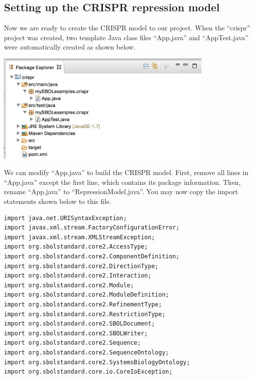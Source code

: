\subsection*{Setting up the CRISPR repression model}
Now we are ready to create the CRISPR model to our project. When the ``crispr'' project was created, two template Java class files ``App.java'' and ``AppTest.java'' were automatically created as shown below. 
\begin{center}
  \includegraphics[width=0.8\textwidth]{figures/addCrisprModel1}
\end{center}

We can modify ``App.java'' to build the CRISPR model. First, remove all lines in ``App.java'' except the first line, which contains its package information. Then, rename ``App.java'' to ``RepressionModel.java''. You may now copy the import statements shown below to this file.

\begin{minipage}{0.95\textwidth} 
\begin{lstlisting}
import java.net.URISyntaxException;
import javax.xml.stream.FactoryConfigurationError;
import javax.xml.stream.XMLStreamException;
import org.sbolstandard.core2.AccessType;
import org.sbolstandard.core2.ComponentDefinition;
import org.sbolstandard.core2.DirectionType;
import org.sbolstandard.core2.Interaction;
import org.sbolstandard.core2.Module;
import org.sbolstandard.core2.ModuleDefinition;
import org.sbolstandard.core2.RefinementType;
import org.sbolstandard.core2.RestrictionType;
import org.sbolstandard.core2.SBOLDocument;
import org.sbolstandard.core2.SBOLWriter;
import org.sbolstandard.core2.Sequence;
import org.sbolstandard.core2.SequenceOntology;
import org.sbolstandard.core2.SystemsBiologyOntology;
import org.sbolstandard.core.io.CoreIoException;
\end{lstlisting}
\end{minipage}

